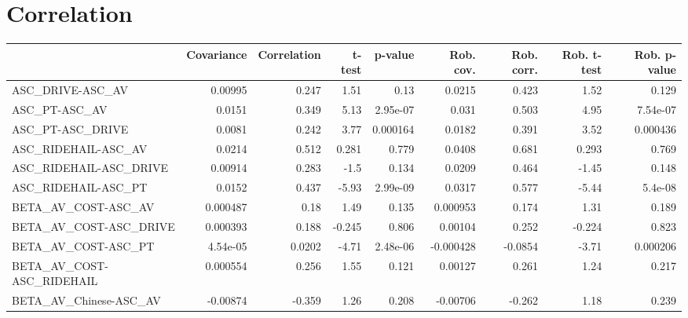 \section{Correlation}
\begin{tabular}{lrrrrrrrr}
\toprule
{} &  Covariance &  Correlation &   t-test &  p-value &  Rob. cov. &  Rob. corr. &  Rob. t-test &  Rob. p-value \\
\midrule
ASC\_DRIVE-ASC\_AV                                   &     0.00995 &        0.247 &     1.51 &     0.13 &     0.0215 &       0.423 &         1.52 &         0.129 \\
ASC\_PT-ASC\_AV                                      &      0.0151 &        0.349 &     5.13 & 2.95e-07 &      0.031 &       0.503 &         4.95 &      7.54e-07 \\
ASC\_PT-ASC\_DRIVE                                   &      0.0081 &        0.242 &     3.77 & 0.000164 &     0.0182 &       0.391 &         3.52 &      0.000436 \\
ASC\_RIDEHAIL-ASC\_AV                                &      0.0214 &        0.512 &    0.281 &    0.779 &     0.0408 &       0.681 &        0.293 &         0.769 \\
ASC\_RIDEHAIL-ASC\_DRIVE                             &     0.00914 &        0.283 &     -1.5 &    0.134 &     0.0209 &       0.464 &        -1.45 &         0.148 \\
ASC\_RIDEHAIL-ASC\_PT                                &      0.0152 &        0.437 &    -5.93 & 2.99e-09 &     0.0317 &       0.577 &        -5.44 &       5.4e-08 \\
BETA\_AV\_COST-ASC\_AV                                &    0.000487 &         0.18 &     1.49 &    0.135 &   0.000953 &       0.174 &         1.31 &         0.189 \\
BETA\_AV\_COST-ASC\_DRIVE                             &    0.000393 &        0.188 &   -0.245 &    0.806 &    0.00104 &       0.252 &       -0.224 &         0.823 \\
BETA\_AV\_COST-ASC\_PT                                &    4.54e-05 &       0.0202 &    -4.71 & 2.48e-06 &  -0.000428 &     -0.0854 &        -3.71 &      0.000206 \\
BETA\_AV\_COST-ASC\_RIDEHAIL                          &    0.000554 &        0.256 &     1.55 &    0.121 &    0.00127 &       0.261 &         1.24 &         0.217 \\
BETA\_AV\_Chinese-ASC\_AV                             &    -0.00874 &       -0.359 &     1.26 &    0.208 &   -0.00706 &      -0.262 &         1.18 &         0.239 \\

\end{tabular}
